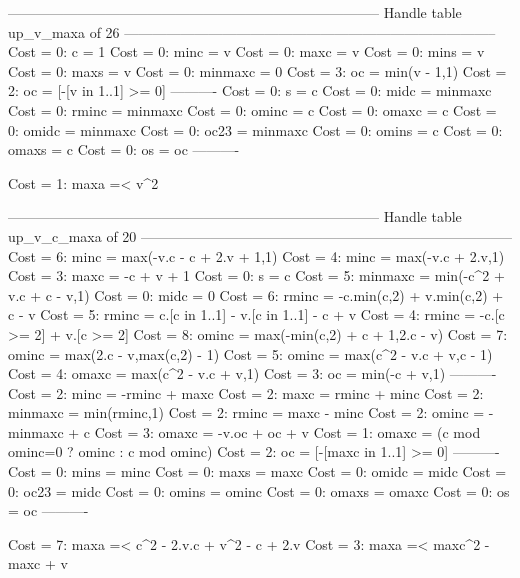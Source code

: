 --------------------------------------------------------------------------------
Handle table up_v_maxa of 26
--------------------------------------------------------------------------------
Cost =  0:  c       = 1
Cost =  0:  minc    = v
Cost =  0:  maxc    = v
Cost =  0:  mins    = v
Cost =  0:  maxs    = v
Cost =  0:  minmaxc = 0
Cost =  3:  oc      = min(v - 1,1)
Cost =  2:  oc      = [-[v in 1..1] >= 0]
----------
Cost =  0:  s       = c
Cost =  0:  midc    = minmaxc
Cost =  0:  rminc   = minmaxc
Cost =  0:  ominc   = c
Cost =  0:  omaxc   = c
Cost =  0:  omidc   = minmaxc
Cost =  0:  oc23    = minmaxc
Cost =  0:  omins   = c
Cost =  0:  omaxs   = c
Cost =  0:  os      = oc
----------

Cost =  1:  maxa =< v^2

--------------------------------------------------------------------------------
Handle table up_v_c_maxa of 20
--------------------------------------------------------------------------------
Cost =  6:  minc    = max(-v.c - c + 2.v + 1,1)
Cost =  4:  minc    = max(-v.c + 2.v,1)
Cost =  3:  maxc    = -c + v + 1
Cost =  0:  s       = c
Cost =  5:  minmaxc = min(-c^2 + v.c + c - v,1)
Cost =  0:  midc    = 0
Cost =  6:  rminc   = -c.min(c,2) + v.min(c,2) + c - v
Cost =  5:  rminc   = c.[c in 1..1] - v.[c in 1..1] - c + v
Cost =  4:  rminc   = -c.[c >= 2] + v.[c >= 2]
Cost =  8:  ominc   = max(-min(c,2) + c + 1,2.c - v)
Cost =  7:  ominc   = max(2.c - v,max(c,2) - 1)
Cost =  5:  ominc   = max(c^2 - v.c + v,c - 1)
Cost =  4:  omaxc   = max(c^2 - v.c + v,1)
Cost =  3:  oc      = min(-c + v,1)
----------
Cost =  2:  minc    = -rminc + maxc
Cost =  2:  maxc    = rminc + minc
Cost =  2:  minmaxc = min(rminc,1)
Cost =  2:  rminc   = maxc - minc
Cost =  2:  ominc   = -minmaxc + c
Cost =  3:  omaxc   = -v.oc + oc + v
Cost =  1:  omaxc   = (c mod ominc=0 ? ominc : c mod ominc)
Cost =  2:  oc      = [-[maxc in 1..1] >= 0]
----------
Cost =  0:  mins    = minc
Cost =  0:  maxs    = maxc
Cost =  0:  omidc   = midc
Cost =  0:  oc23    = midc
Cost =  0:  omins   = ominc
Cost =  0:  omaxs   = omaxc
Cost =  0:  os      = oc
----------

Cost =  7:  maxa =< c^2 - 2.v.c + v^2 - c + 2.v
Cost =  3:  maxa =< maxc^2 - maxc + v

